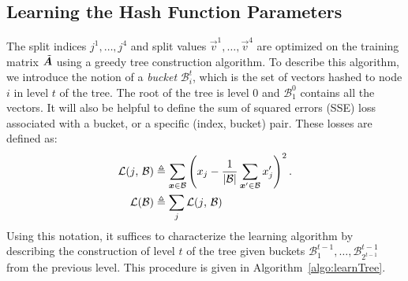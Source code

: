
\subsection{Learning the Hash Function Parameters}

The split indices ${j^1,\ldots,j^4}$ and split values $\vec{v}^1,\ldots,\vec{v}^4$ are optimized on the training matrix $\tilde{\bm{A}}$ using a greedy tree construction algorithm.
To describe this algorithm, we introduce the notion of a \textit{bucket} $\mathcal{B}^t_i$, which is the set of vectors hashed to node $i$ in level $t$ of the tree. The root of the tree is level 0 and $\mathcal{B}^0_1$ contains all the vectors. It will also be helpful to define the sum of squared errors (SSE) loss associated with a bucket, or a specific (index, bucket) pair. These losses are defined as:
\begin{align}
    \mathcal{L}(j \text{, } \mathcal{B}) &\triangleq \sum_{\bm{x} \in \mathcal{B}} \left( x_j - \frac{1}{|\mathcal{B}|}\sum_{\bm{x}^\prime \in \mathcal{B}} x^\prime_j \right)^2.  \\
    \mathcal{L}(\mathcal{B}) &\triangleq \sum_j \mathcal{L}(j \text{, } \mathcal{B})
\end{align}
Using this notation, it suffices to characterize the learning algorithm by describing the construction of level $t$ of the tree given buckets $\mathcal{B}^{t-1}_1,\ldots,\mathcal{B}^{t-1}_{2^{t-1}}$ from the previous level. This procedure is given in Algorithm~\ref{algo:learnTree}.

